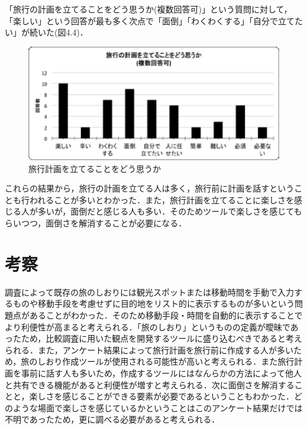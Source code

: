 \documentclass{funthesis}
\begin{document}
「旅行の計画を立てることをどう思うか(複数回答可)」という質問に対して，「楽しい」という回答が最も多く次点で「面倒」「わくわくする」「自分で立てたい」が続いた(図4.4)．\\
\begin{figure}[htpb]
\begin{center}
\includegraphics[scale=1.0]{howthinktrip.eps}
\caption{旅行計画を立てることをどう思うか}
\end{center}
\end{figure}

これらの結果から，旅行の計画を立てる人は多く，旅行前に計画を話すということも行われることが多いとわかった．また，旅行計画を立てることに楽しさを感じる人が多いが，面倒だと感じる人も多い．そのためツールで楽しさを感じてもらいつつ，面倒さを解消することが必要になる．\\

\section{考察}
調査によって既存の旅のしおりには観光スポットまたは移動時間を手動で入力するものや移動手段を考慮せずに目的地をリスト的に表示するものが多いという問題点があることがわかった．そのため移動手段・時間を自動的に表示することでより利便性が高まると考えられる．「旅のしおり」というものの定義が曖昧であったため，比較調査に用いた観点を開発するツールに盛り込むべきであると考えられる．また，アンケート結果によって旅行計画を旅行前に作成する人が多いため，旅のしおり作成ツールが使用される可能性が高いと考えられる．また旅行計画を事前に話す人も多いため，作成するツールにはなんらかの方法によって他人と共有できる機能があると利便性が増すと考えられる．次に面倒さを解消することと，楽しさを感じることができる要素が必要であるということもわかった．どのような場面で楽しさを感じているかということはこのアンケート結果だけでは不明であったため，更に調べる必要があると考えられる．
\end{document}
